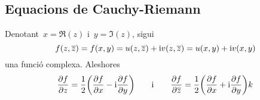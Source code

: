 \documentclass[../Apunts.tex]{subfiles}
\begin{document}
	\subsection{Equacions de Cauchy-Riemann}
	\begin{lemma}
		\label{lema:equacions de Cauchy-Riemann}
		Denotant~\(x=\Re(z)\) i~\(y=\Im(z)\), sigui
		\begin{equation*}
			\label{eq:1:lema:equaciosn de Cauchy-Riemann}
			f(z,\overline{z})=f(x,y)=u(z,\overline{z})+\mathrm{i} v(z,\overline{z})=u(x,y)+\mathrm{i} v(x,y)
		\end{equation*}
		una funció complexa. Aleshores
		\begin{equation*}
			\label{eq:3:lema:equacions de Cauchy-Riemann}
			\frac{\partial f}{\partial z}=\frac{1}{2}\biggl(\frac{\partial f}{\partial x}-\mathrm{i}\frac{\partial f}{\partial y}\biggr)\qquad\text{i}\qquad\frac{\partial f}{\partial\overline{z}}=\frac{1}{2}\biggl(\frac{\partial f}{\partial x}+\mathrm{i}\frac{\partial f}{\partial y}\biggr)
k	\end{equation*}
	\end{lemma}
\end{document}
